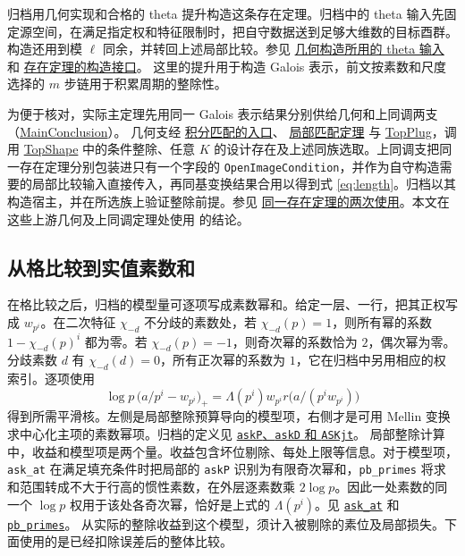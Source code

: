 \documentclass[UTF8,fontset=none,a4paper,11pt]{ctexart}
\theoremstyle{definition}
\newcommand{\src}[3]{\href{https://github.com/leanprover-community/riemann-hypothesis/blob/23aebbb302010b292314d406aa97f7901d698634/src/#1.lean\#L#2}{#3}}
\begin{document}
归档用几何实现和合格的 theta 提升构造这条存在定理。归档中的 theta 输入先固定源空间，在满足指定权和特征限制时，把自守数据送到足够大维数的目标酉群。构造还用到模 $\ell$ 同余，并转回上述局部比较。参见
\src{Development/AutomorphicArithmetic/Foundations/GaloisRepresentations/ThetaParseval/HalfIndexLattices/TLiftK}{12}{几何构造所用的 theta 输入}
和 \src{Development/AutomorphicArithmetic/Foundations/GaloisRepresentations/IntegralStructures/Development}{20}{存在定理的构造接口}。
这里的提升用于构造 Galois 表示，前文按素数和尺度选择的 $m$ 步链用于积累周期的整除性。

为便于核对，实际主定理先用同一 Galois 表示结果分别供给几何和上同调两支
（\src{Development/AutomorphicArithmetic/CharacterBoxes/MainConclusion}{7}{MainConclusion}）。
几何支经 \src{Development/AutomorphicArithmetic/ThetaCorrespondence/ThetaPairLifts/ThirdPlaceSeries/EveryCharacterOfLiteratureOfVWin}{810}{积分匹配的入口}、
\src{Development/AutomorphicArithmetic/ThetaCorrespondence/ThetaPairLifts/ThirdPlaceSeries/SiegelEisensteinSecondTermHypotheses}{69}{局部匹配定理}
与 \src{Development/AutomorphicArithmetic/ThetaCorrespondence/ThetaPairLifts/ThirdPlaceSeries/TopPlug}{12}{TopPlug}，调用
\src{Development/AutomorphicArithmetic/ThetaCorrespondence/ThetaPairLifts/ThirdPlaceSeries/TopShape}{47}{TopShape} 中的条件整除、任意 $K$ 的设计存在及上述同族选取。上同调支把同一存在定理分别包装进只有一个字段的 \texttt{OpenImageCondition}，并作为自守构造需要的局部比较输入直接传入，再同基变换结果合用以得到式 \eqref{eq:length}。归档以其构造宿主，并在所选族上验证整除前提。参见
\src{Development/AutomorphicArithmetic/AutomorphicVarieties/ModularityArgument/ThresholdArguments/DenseThresholdCases/VwinOfRow}{4}{同一存在定理的两次使用}。本文在这些上游几何及上同调定理处使用 \cite{archive} 的结论。

\subsection{从格比较到实值素数和}\label{sec:prime-signal}
在格比较之后，归档的模型量可逐项写成素数幂和。给定一层、一行，把其正权写成 $w_{p^i}$。在二次特征 $\chi_{-d}$ 不分歧的素数处，若 $\chi_{-d}(p)=1$，则所有幂的系数 $1-\chi_{-d}(p)^i$ 都为零。若 $\chi_{-d}(p)=-1$，则奇次幂的系数恰为 $2$，偶次幂为零。分歧素数 $d$ 有 $\chi_{-d}(d)=0$，所有正次幂的系数为 $1$，它在归档中另用相应的权索引。逐项使用
\[
 \log p\,\bigl(a/p^i-w_{p^i}\bigr)_+
   =\Lambda(p^i)w_{p^i}r\bigl(a/(p^i w_{p^i})\bigr)
\]
得到所需平滑核。左侧是局部整除预算导向的模型项，右侧才是可用 Mellin 变换求中心化主项的素数幂项。归档的定义见
\src{Formalism/SharpRestriction/GlobalSchurBounds/ZetaZeroFreeRegion}{51}{\texttt{askP}、\texttt{askD} 和 \texttt{ASKjt}}。
局部整除计算中，收益和模型项是两个量。收益包含坏位剔除、每处上限等信息。对于模型项，\texttt{ask\_at} 在满足填充条件时把局部的 \texttt{askP} 识别为有限奇次幂和，\texttt{pb\_primes} 将求和范围转成不大于行高的惯性素数，在外层逐素数乘 $2\log p$。因此一处素数的同一个 $\log p$ 权用于该处各奇次幂，恰好是上式的 $\Lambda(p^i)$。见
\src{Formalism/LocalToGlobal/GlobalTheory/PowFourLtCeilThresholdPrime}{298}{\texttt{ask\_at}}
和 \src{Formalism/LocalToGlobal/GlobalTheory/PowFourLtCeilThresholdPrime}{334}{\texttt{pb\_primes}}。
从实际的整除收益到这个模型，须计入被剔除的素位及局部损失。下面使用的是已经扣除误差后的整体比较。
\end{document}
